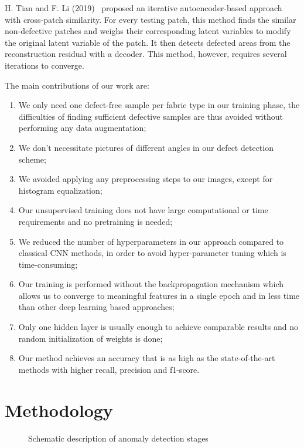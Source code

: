 \documentclass[3p,,preprint,review,12pt]{elsarticle}
\makeatletter
\def\fixFloatSize#1{}%
\makeatother
\begin{document}
H. Tian and F. Li (2019)\unskip~\cite{981091:21201169} proposed an iterative autoencoder-based approach with cross-patch similarity. For every testing patch, this method finds the similar non-defective patches and weighs their corresponding latent variables to modify the original latent variable of the patch. It then detects defected areas from the reconstruction residual with a decoder. This method, however, requires several iterations to converge.


The main contributions of our work are:
  
  \begin{enumerate}
  \item \relax We only need one defect-free sample per fabric type in our training phase, the difficulties of finding sufficient defective samples are thus avoided without performing any data augmentation;
  \item \relax We don't necessitate pictures of different angles in our defect detection scheme;
  \item \relax We avoided applying any preprocessing steps to our images, except for histogram equalization;
  \item \relax Our unsupervised training does not have large computational or time requirements and no pretraining is needed;
  \item \relax We reduced the number of hyperparameters in our approach compared to classical CNN methods, in order to avoid hyper-parameter tuning which is time-consuming; 
  \item \relax Our training is performed without the backpropagation mechanism which allows us to converge to meaningful features in a single epoch and in less time than other deep learning based approaches;
  \item \relax Only one hidden layer is usually enough to achieve comparable results and no random initialization of weights is done;
  \item \relax Our method achieves an accuracy that is as high as the state-of-the-art methods with higher recall, precision and f1-score.
  \end{enumerate}
  
    
\section{Methodology}

\bgroup
\fixFloatSize{Figures/Figure1.jpg}
\begin{figure*}[!htbp]
\centering \makeatletter{}
\makeatother 
\caption{{Schematic description of anomaly detection stages}}
\label{f-ff9ab3b9d830}
\end{figure*}
\egroup
\end{document}
